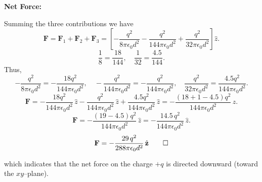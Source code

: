 \begin{hwkProblem}{3.7}{}
	\textbf{Net Force:}  

	Summing the three contributions we have
	\[
	\mathbf{F} = \mathbf{F}_1 + \mathbf{F}_2 + \mathbf{F}_3 = \left[-\frac{q^2}{8\pi\epsilon_0 d^2} - \frac{q^2}{144\pi\epsilon_0 d^2} + \frac{q^2}{32\pi\epsilon_0 d^2}\right]\hat{z}.
	\]
	\[
	\frac{1}{8} = \frac{18}{144}, \quad \frac{1}{32} = \frac{4.5}{144}.
	\]
	Thus,
	\[
	-\frac{q^2}{8\pi\epsilon_0 d^2} = -\frac{18q^2}{144\pi\epsilon_0 d^2}, \quad
	-\frac{q^2}{144\pi\epsilon_0 d^2} = -\frac{q^2}{144\pi\epsilon_0 d^2}, \quad
	\frac{q^2}{32\pi\epsilon_0 d^2} = \frac{4.5q^2}{144\pi\epsilon_0 d^2}.
	\]
	\[
	\mathbf{F} = -\frac{18q^2}{144\pi\epsilon_0 d^2}\,\hat{z} - \frac{q^2}{144\pi\epsilon_0 d^2}\,\hat{z} + \frac{4.5q^2}{144\pi\epsilon_0 d^2}\,\hat{z} = -\frac{(18+1-4.5)q^2}{144\pi\epsilon_0 d^2}\,\hat{z}.
	\]
	\[
	\mathbf{F} = -\frac{(19 - 4.5)q^2}{144\pi\epsilon_0 d^2}\,\hat{z} = -\frac{14.5\,q^2}{144\pi\epsilon_0 d^2}\,\hat{z}.
	\]
	\[
	\mathbf{F} = -\frac{29\,q^2}{288\pi\epsilon_0 d^2}\,\hat{z} \qed
	\]

	which indicates that the net force on the charge \(+q\) is directed downward (toward the \(xy\)–plane).

\end{hwkProblem}
